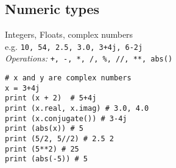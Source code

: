 \subsection{Numeric types}
Integers, Floats, complex numbers \\
e.g. \texttt{10, 54, 2.5, 3.0, 3+4j, 6-2j} \\
\textit{Operations:} \texttt{+, -, *, /, \%, //, **, abs()}
\begin{lstlisting}
# x and y are complex numbers
x = 3+4j
print (x + 2)  # 5+4j
print (x.real, x.imag) # 3.0, 4.0
print (x.conjugate()) # 3-4j
print (abs(x)) # 5
print (5/2, 5//2) # 2.5 2
print (5**2) # 25
print (abs(-5)) # 5
\end{lstlisting}
